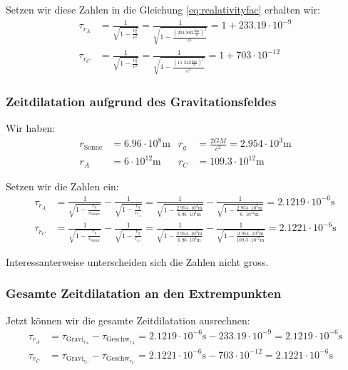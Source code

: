 \begin{refsection}
\noindent{}Setzen wir diese Zahlen in die Gleichung \eqref{eq:realativityfac} erhalten wir:
\begin{align*}
\tau_{r_A} & = \frac{1}{\sqrt{1 - \frac{v_{p}^2}{c^2}}} = \frac{1}{\sqrt{1 - \frac{(204.802 \frac{\text{km}}{\text{s}})^2}{c^2}}} = 1 + 233.19 \cdot 10^{-9}
\\
\tau_{r_C} & = \frac{1}{\sqrt{1 - \frac{v_{a}^2}{c^2}}} = \frac{1}{\sqrt{1 - \frac{(11.242 \frac{\text{km}}{\text{s}})^2}{c^2}}} = 1 + 703 \cdot 10^{-12}
\end{align*}

\subsubsection{Zeitdilatation aufgrund des Gravitationsfeldes}
Wir haben:
\begin{align*}
r_{\text{Sonne}} &= 6.96 \cdot 10^8\text{m} & r_g &= \frac{2GM}{c^2} = 2.954 \cdot 10^3\text{m}
\\
r_A & = 6\cdot 10^{12}\text{m} & r_C &= 109.3\cdot 10^{12}\text{m}
\end{align*}

\noindent{}Setzen wir die Zahlen ein:
\begin{align*}
\tau_{r_A} &= \frac{1}{\sqrt{1-\frac{r_g}{r_{\text{Sonne}}}}} - \frac{1}{\sqrt{1-\frac{r_g}{r_{r_A}}}} =  
\frac{1}{\sqrt{1-\frac{2.954 \cdot 10^3\text{m}}{6.96 \cdot 10^8\text{m}}}} - \frac{1}{\sqrt{1-\frac{2.954 \cdot 10^3\text{m}}{ 6\cdot 10^{12}\text{m} }}} = 2.1219 \cdot 10^{-6}\text{s}
\\
\tau_{r_C} &= \frac{1}{\sqrt{1-\frac{r_g}{r_{\text{Sonne}}}}} - \frac{1}{\sqrt{1-\frac{r_g}{r_{r_C}}}} =  
\frac{1}{\sqrt{1-\frac{2.954 \cdot 10^3\text{m}}{6.96 \cdot 10^8\text{m}}}} - \frac{1}{\sqrt{1-\frac{2.954 \cdot 10^3\text{m}}{ 109.3\cdot 10^{12}\text{m} }}} = 2.1221 \cdot 10^{-6}\text{s}
\end{align*}

\noindent{}Interessanterweise unterscheiden sich die Zahlen nicht gross.

\subsubsection{Gesamte Zeitdilatation an den Extrempunkten}
Jetzt können wir die gesamte Zeitdilatation ausrechnen:
\begin{align*}
\tau_{r_A} & = \tau_{\text{Gravi}_{r_A}} - \tau_{\text{Geschw}_{r_A}} = 2.1219 \cdot 10^{-6}\text{s} - 233.19 \cdot 10^{-9} = 2.1219 \cdot 10^{-6}\text{s}
\\
\tau_{r_C} & = \tau_{\text{Gravi}_{r_C}} - \tau_{\text{Geschw}_{r_C}} = 2.1221 \cdot 10^{-6}\text{s} - 703 \cdot 10^{-12} = 2.1221 \cdot 10^{-6}\text{s}
\end{align*}


\end{refsection}
